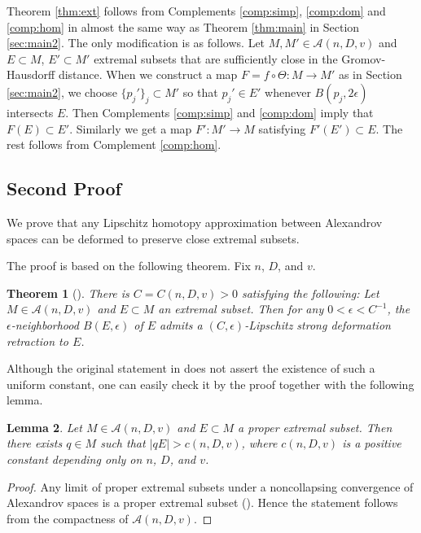 \documentclass[a4paper,12pt]{amsart}
\theoremstyle{plain}
\newtheorem{thm}{Theorem}
\newtheorem{lem}[thm]{Lemma}
\theoremstyle{definition}
\numberwithin{thm}{section}
\numberwithin{equation}{section}
\begin{document}
Theorem \ref{thm:ext} follows from Complements \ref{comp:simp}, \ref{comp:dom} and \ref{comp:hom} in almost the same way as Theorem \ref{thm:main} in Section \ref{sec:main2}.
The only modification is as follows.
Let $M,M'\in\mathcal A(n,D,v)$ and $E\subset M$, $E'\subset M'$ extremal subsets that are sufficiently close in the Gromov-Hausdorff distance.
When we construct a map $F=f\circ\Theta:M\to M'$ as in Section \ref{sec:main2}, we choose $\{p_j'\}_j\subset M'$ so that $p_j'\in E'$ whenever $B(p_j,2\epsilon)$ intersects $E$.
Then Complements \ref{comp:simp} and \ref{comp:dom} imply that $F(E)\subset E'$.
Similarly we get a map $F':M'\to M$ satisfying $F'(E')\subset E$.
The rest follows from Complement \ref{comp:hom}.

\subsection{Second Proof}

We prove that any Lipschitz homotopy approximation between Alexandrov spaces can be deformed to preserve close extremal subsets.

The proof is based on the following theorem.
Fix $n$, $D$, and $v$.

\begin{thm}[{\cite[1.5]{F:reg}}]\label{thm:ndr}
There is $C=C(n,D,v)>0$ satisfying the following:
Let $M\in\mathcal A(n,D,v)$ and $E\subset M$ an extremal subset.
Then for any $0<\epsilon<C^{-1}$, the $\epsilon$-neighborhood $B(E,\epsilon)$ of $E$ admits a $(C,\epsilon)$-Lipschitz strong deformation retraction to $E$.
\end{thm}

Although the original statement in \cite[1.5]{F:reg} does not assert the existence of such a uniform constant, one can easily check it by the proof together with the following lemma.

\begin{lem}\label{lem:ndr}
Let $M\in\mathcal A(n,D,v)$ and $E\subset M$ a proper extremal subset.
Then there exists $q\in M$ such that $|qE|>c(n,D,v)$, where $c(n,D,v)$ is a positive constant depending only on $n$, $D$, and $v$.
\end{lem}

\begin{proof}
Any limit of proper extremal subsets under a noncollapsing convergence of Alexandrov spaces is a proper extremal subset (\cite[9.13]{K:stab}).
Hence the statement follows from the compactness of $\mathcal A(n,D,v)$.
\end{proof}
\end{document}
